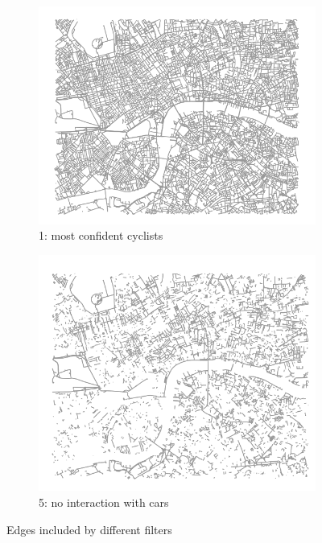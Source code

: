 \documentclass[11pt]{article} %
\begin{document}
\begin{figure}
\centering
\begin{subfigure}{.5\textwidth}
  \centering
  \includegraphics[width=1\linewidth]{bbox_bike_1_filter_cropped}
  \caption{1: most confident cyclists}
  \label{fig:sub1}
\end{subfigure}
\begin{subfigure}{.5\textwidth}
  \centering
  \includegraphics[width=1\linewidth]{bbox_bike_5_filter_cropped}
  \caption{5: no interaction with cars }
  \label{fig:sub2}
\end{subfigure}
\caption{Edges included by different filters}
\label{fig:test}
\end{figure}
\end{document}
